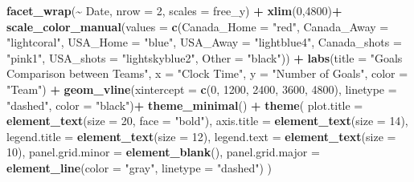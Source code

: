 \documentclass[
  a3paper,
]{article}
\newenvironment{Shaded}{\begin{snugshade}}{\end{snugshade}}
\newcommand{\AttributeTok}[1]{\textcolor[rgb]{0.13,0.29,0.53}{#1}}
\newcommand{\DecValTok}[1]{\textcolor[rgb]{0.00,0.00,0.81}{#1}}
\newcommand{\FunctionTok}[1]{\textcolor[rgb]{0.13,0.29,0.53}{\textbf{#1}}}
\newcommand{\NormalTok}[1]{#1}
\newcommand{\SpecialCharTok}[1]{\textcolor[rgb]{0.81,0.36,0.00}{\textbf{#1}}}
\newcommand{\StringTok}[1]{\textcolor[rgb]{0.31,0.60,0.02}{#1}}
\begin{document}
\begin{Shaded}
\begin{Highlighting}[]
  
  \FunctionTok{facet\_wrap}\NormalTok{(}\SpecialCharTok{\textasciitilde{}}\NormalTok{ Date, }\AttributeTok{nrow =} \DecValTok{2}\NormalTok{, }\AttributeTok{scales =} \StringTok{\textquotesingle{}free\_y\textquotesingle{}}\NormalTok{) }\SpecialCharTok{+}
  \FunctionTok{xlim}\NormalTok{(}\DecValTok{0}\NormalTok{,}\DecValTok{4800}\NormalTok{)}\SpecialCharTok{+}
  \FunctionTok{scale\_color\_manual}\NormalTok{(}\AttributeTok{values =} \FunctionTok{c}\NormalTok{(}\AttributeTok{Canada\_Home =} \StringTok{"red"}\NormalTok{, }\AttributeTok{Canada\_Away =} \StringTok{"lightcoral"}\NormalTok{,}
                               \AttributeTok{USA\_Home =} \StringTok{"blue"}\NormalTok{, }\AttributeTok{USA\_Away =} \StringTok{"lightblue4"}\NormalTok{, }
                               \AttributeTok{Canada\_shots =} \StringTok{"pink1"}\NormalTok{, }\AttributeTok{USA\_shots =} \StringTok{"lightskyblue2"}\NormalTok{,}
                               \AttributeTok{Other =} \StringTok{"black"}\NormalTok{)) }\SpecialCharTok{+}
\FunctionTok{labs}\NormalTok{(}\AttributeTok{title =} \StringTok{"Goals Comparison between Teams"}\NormalTok{, }\AttributeTok{x =} \StringTok{"Clock Time"}\NormalTok{, }\AttributeTok{y =} \StringTok{"Number of Goals"}\NormalTok{, }\AttributeTok{color =} \StringTok{"Team"}\NormalTok{) }\SpecialCharTok{+} 
  \FunctionTok{geom\_vline}\NormalTok{(}\AttributeTok{xintercept =} \FunctionTok{c}\NormalTok{(}\DecValTok{0}\NormalTok{, }\DecValTok{1200}\NormalTok{, }\DecValTok{2400}\NormalTok{, }\DecValTok{3600}\NormalTok{, }\DecValTok{4800}\NormalTok{), }\AttributeTok{linetype =} \StringTok{"dashed"}\NormalTok{, }\AttributeTok{color =} \StringTok{"black"}\NormalTok{)}\SpecialCharTok{+}
  \FunctionTok{theme\_minimal}\NormalTok{() }\SpecialCharTok{+}
  \FunctionTok{theme}\NormalTok{(}
    \AttributeTok{plot.title =} \FunctionTok{element\_text}\NormalTok{(}\AttributeTok{size =} \DecValTok{20}\NormalTok{, }\AttributeTok{face =} \StringTok{"bold"}\NormalTok{),}
    \AttributeTok{axis.title =} \FunctionTok{element\_text}\NormalTok{(}\AttributeTok{size =} \DecValTok{14}\NormalTok{),}
    \AttributeTok{legend.title =} \FunctionTok{element\_text}\NormalTok{(}\AttributeTok{size =} \DecValTok{12}\NormalTok{),}
    \AttributeTok{legend.text =} \FunctionTok{element\_text}\NormalTok{(}\AttributeTok{size =} \DecValTok{10}\NormalTok{),}
    \AttributeTok{panel.grid.minor =} \FunctionTok{element\_blank}\NormalTok{(),}
    \AttributeTok{panel.grid.major =} \FunctionTok{element\_line}\NormalTok{(}\AttributeTok{color =} \StringTok{"gray"}\NormalTok{, }\AttributeTok{linetype =} \StringTok{"dashed"}\NormalTok{)}
\NormalTok{  )}
\end{Highlighting}
\end{Shaded}
\end{document}
